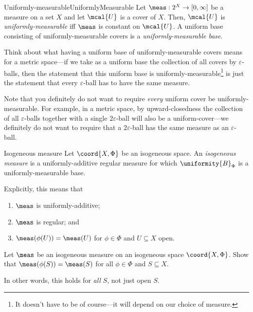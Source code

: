\begin{dfn}{Uniformly-measurable}{UniformlyMeasurable}
Let $\meas :2^X\rightarrow [0,\infty ]$ be a measure on a set $X$ and let $\mcal{U}$ is a cover of $X$.  Then, $\mcal{U}$ is \emph{uniformly-measurable} iff $\meas$ is constant on $\mcal{U}$.  A uniform base consisting of uniformly-measurable covers is a \emph{uniformly-measurable base}.
\begin{rmk}
Think about what having a uniform base of uniformly-measurable covers means for a metric space---if we take as a uniform base the collection of all covers by $\varepsilon$-balls, then the statement that this uniform base is uniformly-measurable\footnote{It doesn't have to be of course---it will depend on our choice of measure.} is just the statement that every $\varepsilon$-ball has to have the same measure.
\end{rmk}
\begin{rmk}
Note that you definitely do not want to require \emph{every} uniform cover be uniformly-measurable.  For example, in a metric space, by upward-closedness the collection of all $\varepsilon$-balls together with a single $2\varepsilon$-ball will also be a uniform-cover---we definitely do not want to require that a $2\varepsilon$-ball has the same measure as an $\varepsilon$-ball.
\end{rmk}
\end{dfn}
\begin{dfn}{Isogeneous measure}{}
Let $\coord{X,\Phi}$ be an isogeneous space.  An \emph{isogeneous measure} is a uniformly-additive regular measure for which $\uniformity{B}_\Phi$ is a uniformly-measurable base.
\begin{rmk}
Explicitly, this means that
\begin{enumerate}
\item $\meas$ is uniformly-additive;
\item $\meas$ is regular; and
\item $\meas (\phi (U))=\meas (U)$ for $\phi \in \Phi$ and $U\subseteq X$ open.
\end{enumerate}
\end{rmk}
\end{dfn}
\begin{exr}{}{}
Let $\meas$ be an isogeneous measure on an isogeneous space $\coord{X,\Phi}$.  Show that $\meas (\phi (S))=\meas (S)$ for all $\phi \in \Phi$ and $S\subseteq X$.
\begin{rmk}
In other words, this holds for \emph{all} $S$, not just open $S$.
\end{rmk}
\end{exr}
